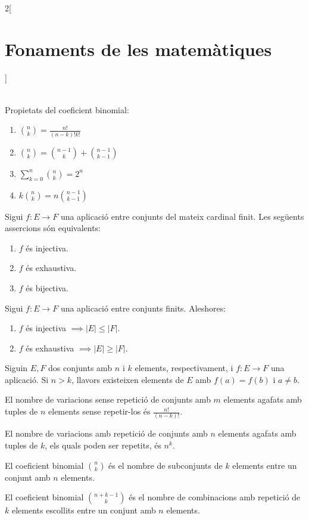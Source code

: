 \documentclass[class=article,10pt,crop=false]{standalone}
\begin{document}
\begin{multicols}{2}[\section{Fonaments de les matemàtiques}]
\begin{definition}
\begin{align*}
\end{align*}
\end{definition}
\begin{prop}
Propietats del coeficient binomial:
\begin{enumerate}
    \item $\binom{n}{k}=\frac{n!}{(n-k)!k!}$
    \item $\binom{n}{k}=\binom{n-1}{k}+\binom{n-1}{k-1}$
    \item $\sum_{k=0}^n\binom{n}{k}=2^n$
    \item $k\binom{n}{k}=n\binom{n-1}{k-1}$
\end{enumerate}
\end{prop}
\begin{prop}
Sigui $f:E\rightarrow F$ una aplicació entre conjunts del mateix cardinal finit. Les següents assercions són equivalents:
\begin{enumerate}
    \item $f$ és injectiva.
    \item $f$ és exhaustiva.
    \item $f$ és bijectiva.
\end{enumerate}
\end{prop}
\begin{corollary}
Sigui $f:E\rightarrow F$ una aplicació entre conjunts finits. Aleshores:
\begin{enumerate}
    \item $f$ és injectiva $\implies|E|\leq|F|$.
    \item $f$ és exhaustiva $\implies|E|\geq|F|$.
\end{enumerate}
\end{corollary}
\begin{theorem}
Siguin $E,F$ dos conjunts amb $n$ i $k$ elements, res\-pec\-ti\-va\-ment, i $f:E\rightarrow F$ una aplicació. Si $n>k$, llavors existeixen elements de $E$ amb $f(a)=f(b)$ i $a\ne b$.
\end{theorem}
\begin{prop}
El nombre de variacions sense repetició de conjunts amb $m$ elements agafats amb tuples de $n$ elements sense repetir-los és $\frac{n!}{(n-k)!}$.
\end{prop}
\begin{prop}
El nombre de variacions amb repetició de conjunts amb $n$ elements agafats amb tuples de $k$, els quals poden ser repetits, és $n^k$.
\end{prop}
\begin{prop}
El coeficient binomial $\binom{n}{k}$ és el nombre de subconjunts de $k$ elements entre un conjunt amb $n$ elements.
\end{prop}
\begin{prop}
El coeficient binomial $\binom{n+k-1}{k}$ és el nombre de combinacions amb repetició de $k$ elements escollits entre un conjunt amb $n$ elements.
\end{prop}

\end{multicols}
\end{document}

